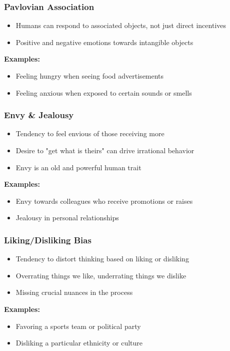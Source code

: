 \begin{frame}[fragile]\frametitle{Pavlovian Association}
\begin{itemize}
    \item Humans can respond to associated objects, not just direct incentives
    \item Positive and negative emotions towards intangible objects
\end{itemize}
\textbf{Examples:}
\begin{itemize}
    \item Feeling hungry when seeing food advertisements
    \item Feeling anxious when exposed to certain sounds or smells
\end{itemize}
\end{frame}

\begin{frame}[fragile]\frametitle{Envy \& Jealousy}
\begin{itemize}
    \item Tendency to feel envious of those receiving more
    \item Desire to "get what is theirs" can drive irrational behavior
    \item Envy is an old and powerful human trait
\end{itemize}
\textbf{Examples:}
\begin{itemize}
    \item Envy towards colleagues who receive promotions or raises
    \item Jealousy in personal relationships
\end{itemize}
\end{frame}

\begin{frame}[fragile]\frametitle{Liking/Disliking Bias}
\begin{itemize}
    \item Tendency to distort thinking based on liking or disliking
    \item Overrating things we like, underrating things we dislike
    \item Missing crucial nuances in the process
\end{itemize}
\textbf{Examples:}
\begin{itemize}
    \item Favoring a sports team or political party
    \item Disliking a particular ethnicity or culture
\end{itemize}
\end{frame}


